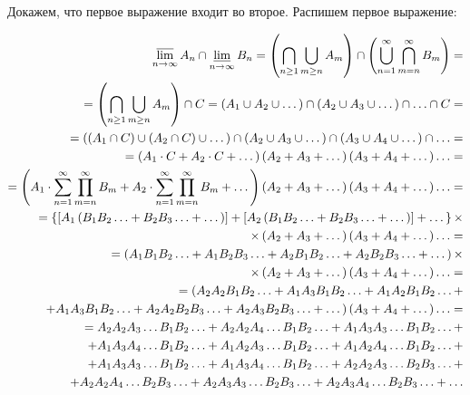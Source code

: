 \documentclass{book}
\begin{document}
Докажем, что первое выражение входит во второе.
Распишем первое выражение:

\begin{equation*}
\begin{split}
\varlimsup \limits_{ n \to \infty } A_n \cap \varliminf \limits_{ n \to \infty } B_n =
\left( \bigcap \limits_{ n \geq 1 } \bigcup \limits_{ m \geq n } A_m \right) \cap
\left( \bigcup \limits_{ n = 1 }^\infty \bigcap \limits_{ m = n }^\infty B_m \right) = \\
= \left( \bigcap \limits_{ n \geq 1 } \bigcup \limits_{ m \geq n } A_m \right) \cap C =
\left( A_1 \cup A_2 \cup \dotsc \right) \cap \left( A_2 \cup A_3 \cup \dotsc \right) \cap \dotsc \cap C = \\
= \left( \left( A_1 \cap C \right) \cup \left( A_2 \cap C \right) \cup \dotsc \right) \cap
\left( A_2 \cup A_3 \cup \dotsc \right) \cap \left( A_3 \cup A_4 \cup \dotsc \right) \cap \dotsc = \\
= \left( A_1 \cdot C + A_2 \cdot C + \dotsc \right) \left( A_2 + A_3 + \dotsc \right)
\left( A_3 + A_4 + \dotsc \right) \dotsc = \\
= \left( A_1 \cdot \sum \limits_{ n = 1 }^\infty \prod \limits_{ m = n }^\infty B_m +
A_2 \cdot \sum \limits_{ n = 1 }^\infty \prod \limits_{ m = n }^\infty B_m + \dotsc \right)
\left( A_2 + A_3 + \dotsc \right) \left( A_3 + A_4 + \dotsc \right) \dotsc =  \\
= \left\{ \left[ A_1 \left( B_1 B_2 \dotsc +B_2 B_3 \dotsc + \dotsc \right) \right] +
\left[ A_2 \left( B_1 B_2 \dotsc +B_2 B_3 \dotsc + \dotsc \right) \right] + \dotsc \right\} \times \\
\times \left( A_2 + A_3 + \dotsc \right) \left( A_3+A_4+ \dotsc \right) \dotsc = \\
= \left( A_1 B_1 B_2 \dotsc + A_1 B_2 B_3 \dotsc + A_2 B_1 B_2 \dotsc + A_2 B_2 B_3 \dotsc + \dotsc \right) \times \\
\times \left( A_2 + A_3 + \dotsc \right) \left( A_3 + A_4 + \dotsc \right) \dotsc = \\
= ( A_2 A_2 B_1 B_2 \dotsc + A_1 A_3 B_1 B_2 \dotsc + A_1 A_2 B_1 B_2 \dotsc + \\
+ A_1 A_3 B_1 B_2 \dotsc + A_2 A_2 B_2 B_3 \dotsc + A_2 A_3 B_2 B_3 \dotsc + \dotsc )
\left( A_3 + A_4+ \dotsc \right) \dotsc = \\
= A_2 A_2 A_3 \dotsc B_1 B_2 \dotsc + A_2 A_2 A_4 \dotsc B_1 B_2 \dotsc + A_1 A_3 A_3 \dotsc B_1 B_2 \dotsc + \\
+ A_1 A_3 A_4 \dotsc B_1 B_2 \dotsc + A_1 A_2 A_3 \dotsc B_1 B_2 \dotsc + A_1 A_2 A_4 \dotsc B_1 B_2 \dotsc + \\
+ A_1 A_3 A_3 \dotsc B_1 B_2 \dotsc + A_1 A_3 A_4 \dotsc B_1 B_2 \dotsc + A_2 A_2 A_3 \dotsc B_2 B_3 \dotsc + \\
+ A_2 A_2 A_4 \dotsc B_2 B_3 \dotsc + A_2 A_3 A_3 \dotsc B_2 B_3 \dotsc + A_2 A_3 A_4 \dotsc B_2 B_3 \dotsc + \dotsc 
\end{split}
\end{equation*}
\end{document}
